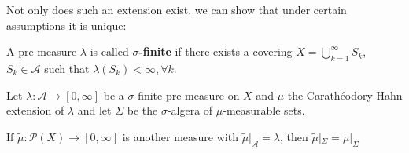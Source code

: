 Not only does such an extension exist, we can show that under certain assumptions it is unique:


\begin{dfn}[]
A pre-measure $\lambda$ is called \textbf{$\sigma$-finite} if there exists a covering $X = \bigcup_{k=1}^{\infty}S_k$, $S_k \in \mathcal{A}$ such that $\lambda(S_k) < \infty, \forall k$.
\end{dfn}


\begin{thm}
  Let $\lambda: \mathcal{A} \to  [0,\infty]$ be a $\sigma$-finite pre-measure on $X$ and $\mu$ the Carathéodory-Hahn extension of $\lambda$ and let $\Sigma$ be the $\sigma$-algera of $\mu$-measurable sets.

  If $\tilde{\mu}: \mathcal{P}(X) \to [0,\infty]$ is another measure with $\tilde{\mu}|_{\mathcal{A}} = \lambda$, then $\tilde{\mu}|_{\Sigma} = \mu|_{\Sigma}$
\end{thm}

